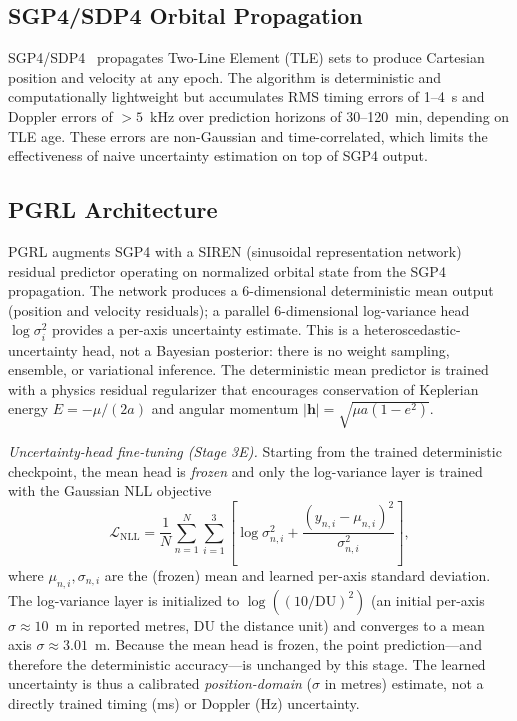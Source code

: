 \documentclass[conference]{IEEEtran}
\begin{document}
\subsection{SGP4/SDP4 Orbital Propagation}
SGP4/SDP4~\cite{hoots1980models} propagates Two-Line Element (TLE) sets to produce Cartesian position and velocity at any epoch. The algorithm is deterministic and computationally lightweight but accumulates RMS timing errors of 1--4~s and Doppler errors of $>5$~kHz over prediction horizons of 30--120~min, depending on TLE age. These errors are non-Gaussian and time-correlated, which limits the effectiveness of naive uncertainty estimation on top of SGP4 output.

\subsection{PGRL Architecture}
PGRL augments SGP4 with a SIREN (sinusoidal representation network) residual predictor operating on normalized orbital state from the SGP4 propagation. The network produces a $6$-dimensional deterministic mean output (position and velocity residuals); a parallel $6$-dimensional log-variance head $\log\sigma_i^2$ provides a per-axis uncertainty estimate. This is a heteroscedastic-uncertainty head, not a Bayesian posterior: there is no weight sampling, ensemble, or variational inference. The deterministic mean predictor is trained with a physics residual regularizer that encourages conservation of Keplerian energy $E=-\mu/(2a)$ and angular momentum $|\mathbf{h}|=\sqrt{\mu a(1-e^2)}$.

\emph{Uncertainty-head fine-tuning (Stage 3E).} Starting from the trained deterministic checkpoint, the mean head is \emph{frozen} and only the log-variance layer is trained with the Gaussian NLL objective
\begin{equation}
\mathcal{L}_{\text{NLL}} = \frac{1}{N}\sum_{n=1}^{N}\sum_{i=1}^{3}\left[
  \log\sigma_{n,i}^2 + \frac{(y_{n,i} - \mu_{n,i})^2}{\sigma_{n,i}^2}
\right],
\label{eq:nll}
\end{equation}
where $\mu_{n,i},\sigma_{n,i}$ are the (frozen) mean and learned per-axis standard deviation. The log-variance layer is initialized to $\log((10/\mathrm{DU})^2)$ (an initial per-axis $\sigma\approx 10$~m in reported metres, $\mathrm{DU}$ the distance unit) and converges to a mean axis $\sigma\approx 3.01$~m. Because the mean head is frozen, the point prediction---and therefore the deterministic accuracy---is unchanged by this stage. The learned uncertainty is thus a calibrated \emph{position-domain} ($\sigma$ in metres) estimate, not a directly trained timing (ms) or Doppler (Hz) uncertainty.
\end{document}
